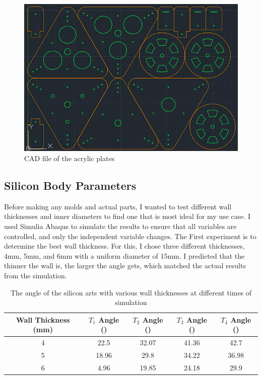 \documentclass[twoside]{article}
\begin{document}
\begin{figure} [H]
	\centering
	\includegraphics[scale=0.5]{acrylic_plate_cad}
	\caption{CAD file of the acrylic plates}
\end{figure}

\subsection{Silicon Body Parameters}
Before making any molds and actual parts, I wanted to test different wall thicknesses and inner diameters to find one that is most ideal for my use case. I used Simulia Abaqus to simulate the results to ensure that all variables are controlled, and only the independent variable changes. The First experiment is to determine the best wall thickness. For this, I chose three different thicknesses, 4mm, 5mm, and 6mm with a uniform diameter of 15mm. I predicted that the thinner the wall is, the larger the angle gets, which matched the actual results from the simulation.

\begin{table} [H]
	\centering
	\begin{tabular}{|c|c|c|c|c|}
	\hline
	Wall Thickness (mm) & $T_{1}$ Angle (\degree) & $T_{2}$ Angle (\degree) & $T_{3}$ Angle (\degree) & $T_{4}$ Angle (\degree)\\
	\hline
	4 & 22.5 & 32.07 & 41.36 & 42.7\\
	\hline
	5 & 18.96 & 29.8 & 34.22 & 36.98\\
	\hline
	6 & 4.96& 19.85 & 24.18 & 29.9\\
	\hline
	\end{tabular}
	\caption{The angle of the silicon arts with various wall thicknesses at different times of simulation}
\end{table}
\end{document}
